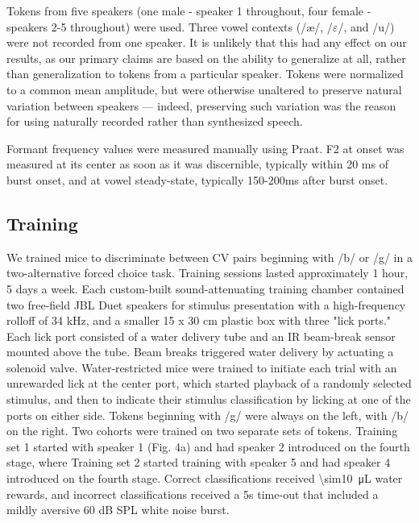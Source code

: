 Tokens from five speakers (one male - speaker 1 throughout, four female - speakers 2-5 throughout) were used. Three vowel contexts (/\ae/, /$\varepsilon$/, and /u/) were not recorded from one speaker. It is unlikely that this had any effect on our results, as our primary claims are based on the ability to generalize at all, rather than generalization to tokens from a particular speaker. Tokens were normalized to a common mean amplitude, but were otherwise unaltered to preserve natural variation between speakers --- indeed, preserving such variation was the reason for using naturally recorded rather than synthesized speech.

Formant frequency values were measured manually using Praat\cite{Boersma2001}. F2 at onset was measured at its center as soon as it was discernible, typically within 20 ms of burst onset, and at vowel steady-state, typically 150-200ms after burst onset.

\subsection{Training}

We trained mice to discriminate between CV pairs beginning with /b/ or /g/ in a two-alternative forced choice task. Training sessions lasted approximately 1 hour, 5 days a week. Each custom-built sound-attenuating training chamber contained two free-field JBL Duet speakers for stimulus presentation with a high-frequency rolloff of 34 kHz, and a smaller 15 x 30 cm plastic box with three "lick ports." Each lick port consisted of a water delivery tube and an IR beam-break sensor mounted above the tube. Beam breaks triggered water delivery by actuating a solenoid valve. Water-restricted mice were trained to initiate each trial with an unrewarded lick at the center port, which started playback of a randomly selected stimulus, and then to indicate their stimulus classification by licking at one of the ports on either side. Tokens beginning with /g/ were always on the left, with /b/ on the right. Two cohorts were trained on two separate sets of tokens. Training set 1 started with speaker 1 (Fig. 4a) and had speaker 2 introduced on the fourth stage, where Training set 2 started training with speaker 5 and had speaker 4 introduced on the fourth stage. Correct classifications received \SI{\sim10}{\micro\liter} water rewards, and incorrect classifications received a 5s time-out that included a mildly aversive 60 dB SPL white noise burst.

